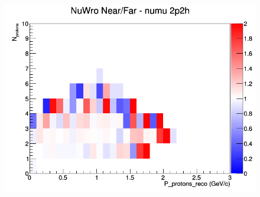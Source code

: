 \begin{figure}[h]
\endminipage
{}
\includegraphics[width=\linewidth]{eff_N_P/LAr/protons/ratios/2p2h_NuWro_numu_NF_N_P.png}
\endminipage
\newline
\end{figure}
\clearpage
